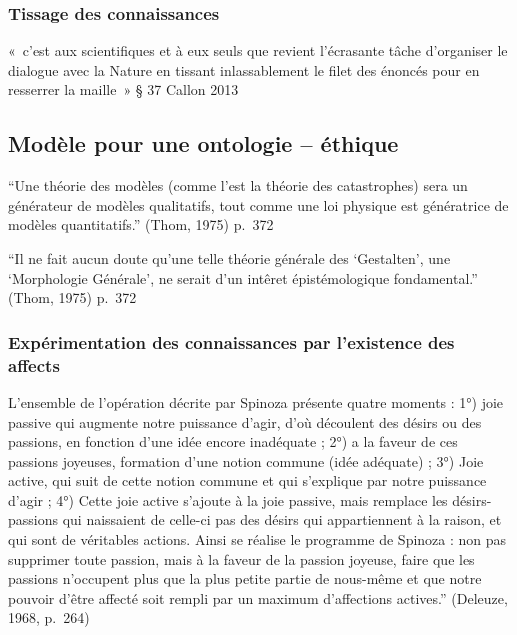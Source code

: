 \documentclass[
  letterpaper,
  DIV=11,
  numbers=noendperiod]{scrreprt}
\begin{document}
\hypertarget{tissage-des-connaissances}{%
\subsubsection{Tissage des
connaissances}\label{tissage-des-connaissances}}

«~c'est aux scientifiques et à eux seuls que revient l'écrasante tâche
d'organiser le dialogue avec la Nature en tissant inlassablement le
filet des énoncés pour en resserrer la maille~» § 37 Callon 2013

\hypertarget{sec-modeleOntoEthique}{%
\subsection{Modèle pour une ontologie --
éthique}\label{sec-modeleOntoEthique}}

``Une théorie des modèles (comme l'est la théorie des catastrophes) sera
un générateur de modèles qualitatifs, tout comme une loi physique est
génératrice de modèles quantitatifs.'' (Thom, 1975) p.~372

``Il ne fait aucun doute qu'une telle théorie générale des `Gestalten',
une `Morphologie Générale', ne serait d'un intêret épistémologique
fondamental.'' (Thom, 1975) p.~372

\hypertarget{expuxe9rimentation-des-connaissances-par-lexistence-des-affects}{%
\subsubsection{Expérimentation des connaissances par l'existence des
affects}\label{expuxe9rimentation-des-connaissances-par-lexistence-des-affects}}

L'ensemble de l'opération décrite par Spinoza présente quatre moments :
1°) joie passive qui augmente notre puissance d'agir, d'où découlent des
désirs ou des passions, en fonction d'une idée encore inadéquate ; 2°) a
la faveur de ces passions joyeuses, formation d'une notion commune (idée
adéquate) ; 3°) Joie active, qui suit de cette notion commune et qui
s'explique par notre puissance d'agir ; 4°) Cette joie active s'ajoute à
la joie passive, mais remplace les désirs-passions qui naissaient de
celle-ci pas des désirs qui appartiennent à la raison, et qui sont de
véritables actions. Ainsi se réalise le programme de Spinoza : non pas
supprimer toute passion, mais à la faveur de la passion joyeuse, faire
que les passions n'occupent plus que la plus petite partie de nous-même
et que notre pouvoir d'être affecté soit rempli par un maximum
d'affections actives.'' (Deleuze, 1968, p.~264)
\end{document}
